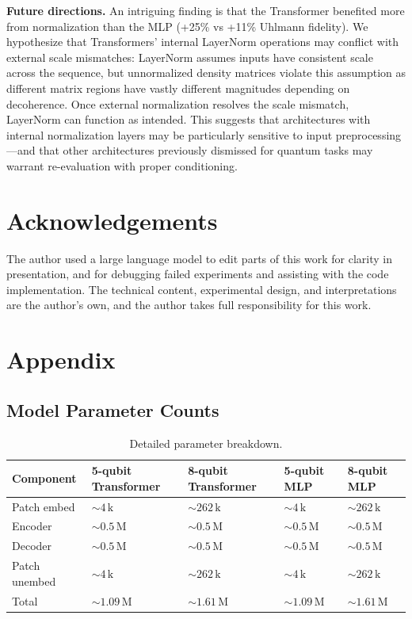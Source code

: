 \documentclass[11pt]{article}
\begin{document}
\textbf{Future directions.} An intriguing finding is that the Transformer benefited more from normalization than the MLP (+25\% vs +11\% Uhlmann fidelity). We hypothesize that Transformers' internal LayerNorm operations may conflict with external scale mismatches: LayerNorm assumes inputs have consistent scale across the sequence, but unnormalized density matrices violate this assumption as different matrix regions have vastly different magnitudes depending on decoherence. Once external normalization resolves the scale mismatch, LayerNorm can function as intended. This suggests that architectures with internal normalization layers may be particularly sensitive to input preprocessing---and that other architectures previously dismissed for quantum tasks may warrant re-evaluation with proper conditioning.
\section{Acknowledgements}
\label{sec:org0379bd2}
The author used a large language model to edit parts of this work for clarity in presentation, and for debugging failed experiments and assisting with the code implementation. The technical content, experimental design, and interpretations are the author's own, and the author takes full responsibility for this work.
\section{Appendix}
\label{sec:orgc39af13}

\subsection{Model Parameter Counts}
\label{sec:org318a54c}
\begin{table}[htbp]
\caption{\label{tab:org7776841}Detailed parameter breakdown.}
\centering
\begin{tabular}{lllll}
Component & 5-qubit Transformer & 8-qubit Transformer & 5-qubit MLP & 8-qubit MLP\\
\hline
Patch embed & \(\sim 4\,\mathrm{k}\) & \(\sim 262\,\mathrm{k}\) & \(\sim 4\,\mathrm{k}\) & \(\sim 262\,\mathrm{k}\)\\
Encoder & \(\sim 0.5\,\mathrm{M}\) & \(\sim 0.5\,\mathrm{M}\) & \(\sim 0.5\,\mathrm{M}\) & \(\sim 0.5\,\mathrm{M}\)\\
Decoder & \(\sim 0.5\,\mathrm{M}\) & \(\sim 0.5\,\mathrm{M}\) & \(\sim 0.5\,\mathrm{M}\) & \(\sim 0.5\,\mathrm{M}\)\\
Patch unembed & \(\sim 4\,\mathrm{k}\) & \(\sim 262\,\mathrm{k}\) & \(\sim 4\,\mathrm{k}\) & \(\sim 262\,\mathrm{k}\)\\
Total & \(\sim 1.09\,\mathrm{M}\) & \(\sim 1.61\,\mathrm{M}\) & \(\sim 1.09\,\mathrm{M}\) & \(\sim 1.61\,\mathrm{M}\)\\
\end{tabular}
\end{table}
\end{document}
